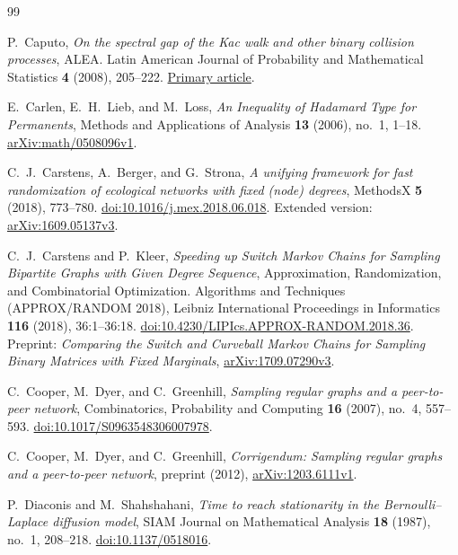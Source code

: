 \begin{thebibliography}{99}

P.~Caputo,
\emph{On the spectral gap of the Kac walk and other binary collision processes},
ALEA. Latin American Journal of Probability and Mathematical Statistics
\textbf{4} (2008), 205--222.
\href{https://alea.impa.br/articles/v4/04-10.pdf}{Primary article}.

E.~Carlen, E.~H.~Lieb, and M.~Loss,
\emph{An Inequality of Hadamard Type for Permanents},
Methods and Applications of Analysis \textbf{13} (2006), no.~1, 1--18.
\href{https://arxiv.org/abs/math/0508096v1}{arXiv:math/0508096v1}.

C.~J.~Carstens, A.~Berger, and G.~Strona,
\emph{A unifying framework for fast randomization of ecological networks with fixed (node) degrees},
MethodsX \textbf{5} (2018), 773--780.\newline
\href{https://doi.org/10.1016/j.mex.2018.06.018}{doi:10.1016/j.mex.2018.06.018}.
Extended version: \href{https://arxiv.org/abs/1609.05137v3}{arXiv:1609.05137v3}.

C.~J.~Carstens and P.~Kleer,
\emph{Speeding up Switch Markov Chains for Sampling Bipartite Graphs
with Given Degree Sequence},
Approximation, Randomization, and Combinatorial Optimization.
Algorithms and Techniques (APPROX/RANDOM 2018),
Leibniz International Proceedings in Informatics \textbf{116} (2018), 36:1--36:18.
\href{https://doi.org/10.4230/LIPIcs.APPROX-RANDOM.2018.36}{doi:10.4230/LIPIcs.APPROX-RANDOM.2018.36}.
Preprint: \emph{Comparing the Switch and Curveball Markov Chains for Sampling
Binary Matrices with Fixed Marginals},
\href{https://arxiv.org/abs/1709.07290v3}{arXiv:1709.07290v3}.

C.~Cooper, M.~Dyer, and C.~Greenhill,
\emph{Sampling regular graphs and a peer-to-peer network},
Combinatorics, Probability and Computing \textbf{16} (2007), no.~4, 557--593.\newline
\href{https://doi.org/10.1017/S0963548306007978}{doi:10.1017/S0963548306007978}.

C.~Cooper, M.~Dyer, and C.~Greenhill,
\emph{Corrigendum: Sampling regular graphs and a peer-to-peer network},
preprint (2012),
\href{https://arxiv.org/abs/1203.6111v1}{arXiv:1203.6111v1}.

P.~Diaconis and M.~Shahshahani,
\emph{Time to reach stationarity in the Bernoulli--Laplace diffusion model},
SIAM Journal on Mathematical Analysis \textbf{18} (1987), no.~1, 208--218.
\href{https://doi.org/10.1137/0518016}{doi:10.1137/0518016}.


\end{thebibliography}
